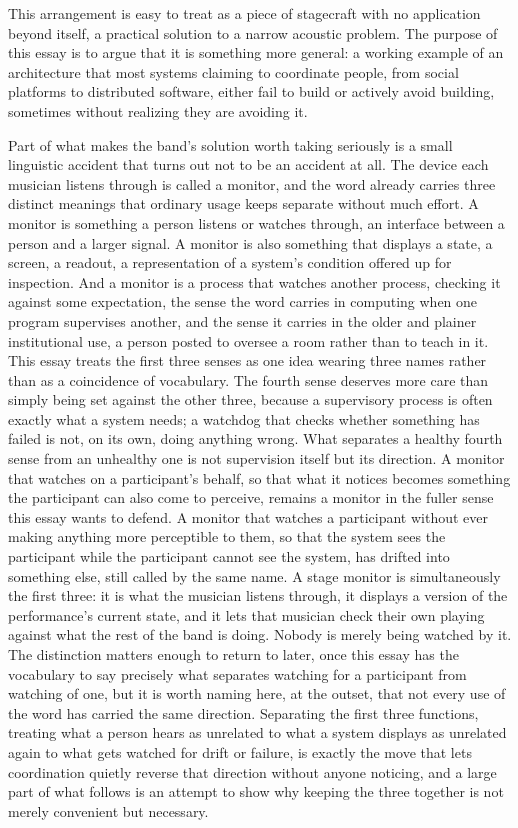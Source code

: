 \documentclass[12pt]{article}
\begin{document}
This arrangement is easy to treat as a piece of stagecraft with no application beyond itself, a practical solution to a narrow acoustic problem. The purpose of this essay is to argue that it is something more general: a working example of an architecture that most systems claiming to coordinate people, from social platforms to distributed software, either fail to build or actively avoid building, sometimes without realizing they are avoiding it.

Part of what makes the band's solution worth taking seriously is a small linguistic accident that turns out not to be an accident at all. The device each musician listens through is called a monitor, and the word already carries three distinct meanings that ordinary usage keeps separate without much effort. A monitor is something a person listens or watches through, an interface between a person and a larger signal. A monitor is also something that displays a state, a screen, a readout, a representation of a system's condition offered up for inspection. And a monitor is a process that watches another process, checking it against some expectation, the sense the word carries in computing when one program supervises another, and the sense it carries in the older and plainer institutional use, a person posted to oversee a room rather than to teach in it. This essay treats the first three senses as one idea wearing three names rather than as a coincidence of vocabulary. The fourth sense deserves more care than simply being set against the other three, because a supervisory process is often exactly what a system needs; a watchdog that checks whether something has failed is not, on its own, doing anything wrong. What separates a healthy fourth sense from an unhealthy one is not supervision itself but its direction. A monitor that watches on a participant's behalf, so that what it notices becomes something the participant can also come to perceive, remains a monitor in the fuller sense this essay wants to defend. A monitor that watches a participant without ever making anything more perceptible to them, so that the system sees the participant while the participant cannot see the system, has drifted into something else, still called by the same name. A stage monitor is simultaneously the first three: it is what the musician listens through, it displays a version of the performance's current state, and it lets that musician check their own playing against what the rest of the band is doing. Nobody is merely being watched by it. The distinction matters enough to return to later, once this essay has the vocabulary to say precisely what separates watching for a participant from watching of one, but it is worth naming here, at the outset, that not every use of the word has carried the same direction. Separating the first three functions, treating what a person hears as unrelated to what a system displays as unrelated again to what gets watched for drift or failure, is exactly the move that lets coordination quietly reverse that direction without anyone noticing, and a large part of what follows is an attempt to show why keeping the three together is not merely convenient but necessary.
\end{document}
